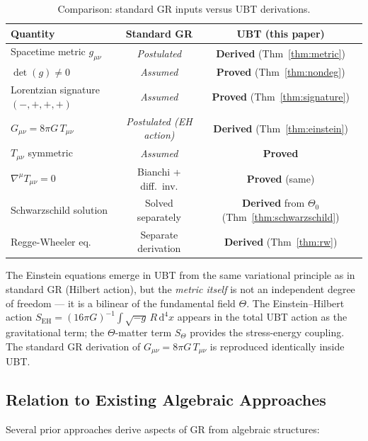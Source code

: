 \documentclass[12pt,a4paper]{article}
\theoremstyle{definition}
\theoremstyle{remark}
\begin{document}
\begin{table}[ht]
\centering
\caption{Comparison: standard GR inputs versus UBT derivations.}
\label{tab:comparison}
\begin{tabular}{lcc}
\toprule
\textbf{Quantity} & \textbf{Standard GR} & \textbf{UBT (this paper)} \\
\midrule
Spacetime metric $g_{\mu\nu}$ & \emph{Postulated} & \textbf{Derived} (Thm~\ref{thm:metric}) \\
$\det(g) \neq 0$ & \emph{Assumed} & \textbf{Proved} (Thm~\ref{thm:nondeg}) \\
Lorentzian signature $(-,+,+,+)$ & \emph{Assumed} & \textbf{Proved} (Thm~\ref{thm:signature}) \\
$G_{\mu\nu} = 8\pi G\,T_{\mu\nu}$ & \emph{Postulated (EH action)} & \textbf{Derived} (Thm~\ref{thm:einstein}) \\
$T_{\mu\nu}$ symmetric & \emph{Assumed} & \textbf{Proved} \\
$\nabla^\mu T_{\mu\nu} = 0$ & Bianchi + diff.\ inv. & \textbf{Proved} (same) \\
Schwarzschild solution & Solved separately & \textbf{Derived} from $\Theta_0$ (Thm~\ref{thm:schwarzschild}) \\
Regge-Wheeler eq. & Separate derivation & \textbf{Derived} (Thm~\ref{thm:rw}) \\
\bottomrule
\end{tabular}
\end{table}

The Einstein equations emerge in UBT from the same variational principle as
in standard GR (Hilbert action), but the \emph{metric itself} is not an
independent degree of freedom --- it is a bilinear of the fundamental field
$\Theta$.
The Einstein--Hilbert action $S_{\mathrm{EH}} = (16\pi G)^{-1}\int\!\sqrt{-g}\,R\,\mathrm{d}^4x$
appears in the total UBT action as the gravitational term; the $\Theta$-matter
term $S_\Theta$ provides the stress-energy coupling.
The standard GR derivation of $G_{\mu\nu} = 8\pi G\,T_{\mu\nu}$ is
reproduced identically inside UBT.

\subsection{Relation to Existing Algebraic Approaches}

Several prior approaches derive aspects of GR from algebraic structures:
\end{document}
